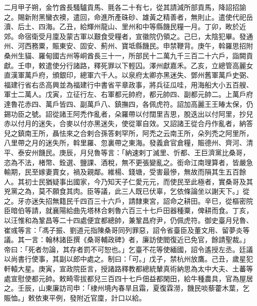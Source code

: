 \begin{pinyinscope}
 二月甲子朔，金竹酋長騷驢貢馬、氈各二十有七，從其請減所部貢馬，降詔招諭之。賜新附黑蠻衣襖，遣回，命進所產硃砂、雄黃之精善者，無則止。遣使代祀岳瀆、后土、四海。乙丑，給輝州龍山、里州和中等縣饑民糧一月。丁卯，畋於近郊。命宿衛受月廩及蒙古軍以艱食受糧者，宣徽院仍領之。己巳，太陰犯畢。發通州、河西務粟，賑東安、固安、薊州、寶坻縣饑民。申禁鞭背。庚午，斡羅思招附桑州生貓、羅甸國古州等峒酋長三十一，所部民十二萬九千三百二十六戶，詣闕貢獻。壬申，敕遣使分行諸路，釋死罪以下輕囚。澤州獻嘉禾。乙亥，立總管高麗女直漢軍萬戶府，頒銀印，總軍六千人。以泉府太卿亦黑迷失、鄧州舊軍萬戶史弼、福建行省右丞高興並為福建行中書省平章政事，將兵征瓜哇，用海船大小五百艘、軍士二萬人。戊寅，立征行左、右軍都元帥府，都元帥四、副都元帥二。上萬戶府達魯花赤四、萬戶皆四、副萬戶八、鎮撫四，各佩虎符。詔加高麗王王睶太保，仍錫功臣之號。詔從諸王阿禿作亂者，朵羅帶以付闊里吉思，脫迭出以付阿里，抄兒赤以付月的迷失，合麥以付亦黑迷失，使從軍自效。又詔諸王從合丹作亂者，納答兒之鎮南王所，聶怯來之合剌合孫答剌罕所，阿禿之云南王所，朵列禿之阿里所，八里帶之月的迷失所，斡里羅、忽裏帶之東海。發義倉官倉糧，賑德州、齊河、清平、泰安州饑民。庚辰，月兒魯等言：「納速剌丁滅里、忻都、王巨濟黨比桑哥，恣為不法，楮幣、銓選、鹽課、酒稅，無不更張變亂之。銜命江南理算者，皆嚴急輸期，民至嫁妻賣女，禍及親鄰。維楊、錢塘，受害最慘，無故而隕其生五百餘人。其初士民猶疑事出國家，今乃知天子仁愛元元，而使民至此極者，實桑哥及其兇黨之為，莫不願食其肉。臣等議，此三人既已伏辜，乞依條論坐以謝天下。」從之。牙亦迷失招無籍民千四百三十六戶，請隸東宮，詔命之耕田。辛巳，從樞密院臣暗伯等請，就襄陽給曲先塔林合剌魯六百三十七戶田器種粟，俾耕而食。丁亥，以汪惟和為鞏昌等二十四處便宜都總帥，兼鞏昌府尹，仍佩虎符。御史臺月兒魯、崔彧等言：「馮子振、劉道元指陳桑哥同列罪惡，詔令省臺臣及董文用、留夢炎等議。其一言：翰林諸臣撰《桑哥輔政碑》者，廉訪使閻復近已免官，餘請聖裁。」帝曰：「死者勿論，其存者罰不可恕也。」乞臺不花等使緬國，詔令遙授左丞。廷議以尚書行使事，其副以郎中處之。制曰：「可。」戊子，禁杭州放鷹。己丑，歲星犯軒轅大星。庚寅，宣政院臣言，授諸路釋教都總統輦真術納思為太中大夫、土蕃等處宣慰使都元帥。敕畸零拔都兒三百四十七戶佃益都閑田，給牛種農具，官為屋居之。壬辰，山東廉訪司申：「棣州境內春旱且霜，夏復霖澇，饑民啖藜藿木葉，乞賑恤。」敕依東平例，發附近官廩，計口以給。




\end{pinyinscope}
